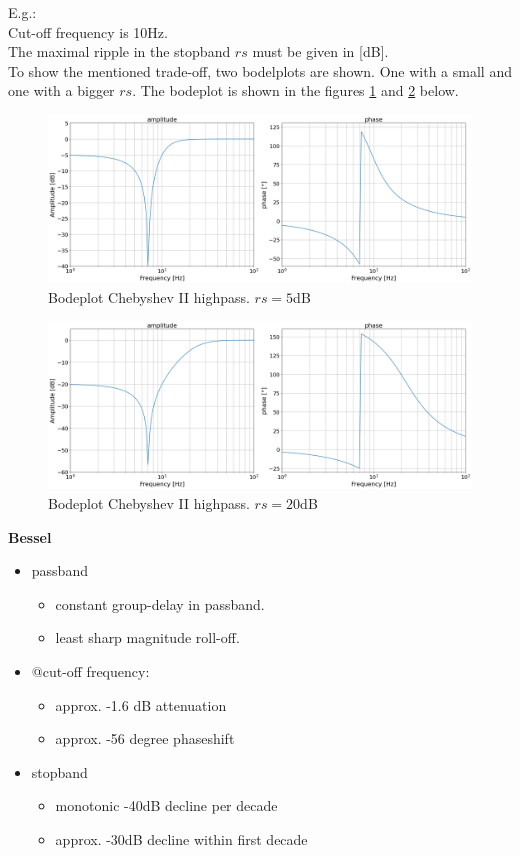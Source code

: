 E.g.: \\
Cut-off frequency is 10Hz.\\
The maximal ripple in the stopband $rs$ must be given in [dB].\\
To show the mentioned trade-off, two bodelplots are shown. One with a small and one with a bigger $rs$.
The bodeplot is shown in the figures \ref{fig:hp_cheby2_1} and \ref{fig:hp_cheby2_2} below.
\begin{figure}[h!]
  \centering
  \includegraphics[width=.75\linewidth]{hp_cheby2_5dB.png}
  \caption{Bodeplot Chebyshev II highpass. $rs=5$dB}
  \label{fig:hp_cheby2_1}
\end{figure}

\begin{figure}[h!]
  \centering
  \includegraphics[width=.75\linewidth]{hp_cheby2_20dB.png}
  \caption{Bodeplot Chebyshev II highpass. $rs=20$dB}
  \label{fig:hp_cheby2_2}
\end{figure}

\textbf{Bessel}\\
\begin{itemize}
    \item passband
    \begin{itemize}
        \item constant group-delay in passband.
		\item least sharp magnitude roll-off.
    \end{itemize}
    \item @cut-off frequency:
    \begin{itemize}
        \item approx. -1.6 dB attenuation
        \item approx. -56 degree phaseshift
    \end{itemize}
    \item stopband 
    \begin{itemize}
        \item monotonic -40dB decline per decade
        \item approx. -30dB decline within first decade
    \end{itemize} 
\end{itemize}

